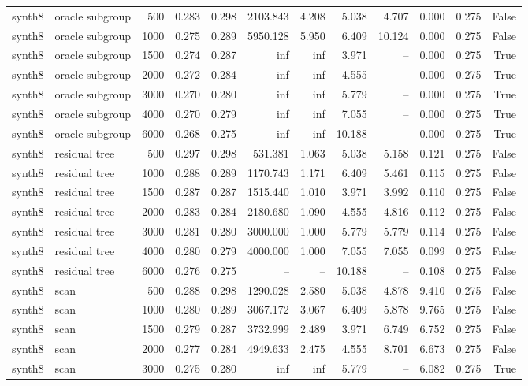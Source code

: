 \begin{tabular}{llrrrrrrrrrr}
synth8 & oracle subgroup & 500 & 0.283 & 0.298 & 2103.843 & 4.208 & 5.038 & 4.707 & 0.000 & 0.275 & False \\
synth8 & oracle subgroup & 1000 & 0.275 & 0.289 & 5950.128 & 5.950 & 6.409 & 10.124 & 0.000 & 0.275 & False \\
synth8 & oracle subgroup & 1500 & 0.274 & 0.287 & inf & inf & 3.971 & -- & 0.000 & 0.275 & True \\
synth8 & oracle subgroup & 2000 & 0.272 & 0.284 & inf & inf & 4.555 & -- & 0.000 & 0.275 & True \\
synth8 & oracle subgroup & 3000 & 0.270 & 0.280 & inf & inf & 5.779 & -- & 0.000 & 0.275 & True \\
synth8 & oracle subgroup & 4000 & 0.270 & 0.279 & inf & inf & 7.055 & -- & 0.000 & 0.275 & True \\
synth8 & oracle subgroup & 6000 & 0.268 & 0.275 & inf & inf & 10.188 & -- & 0.000 & 0.275 & True \\
synth8 & residual tree & 500 & 0.297 & 0.298 & 531.381 & 1.063 & 5.038 & 5.158 & 0.121 & 0.275 & False \\
synth8 & residual tree & 1000 & 0.288 & 0.289 & 1170.743 & 1.171 & 6.409 & 5.461 & 0.115 & 0.275 & False \\
synth8 & residual tree & 1500 & 0.287 & 0.287 & 1515.440 & 1.010 & 3.971 & 3.992 & 0.110 & 0.275 & False \\
synth8 & residual tree & 2000 & 0.283 & 0.284 & 2180.680 & 1.090 & 4.555 & 4.816 & 0.112 & 0.275 & False \\
synth8 & residual tree & 3000 & 0.281 & 0.280 & 3000.000 & 1.000 & 5.779 & 5.779 & 0.114 & 0.275 & False \\
synth8 & residual tree & 4000 & 0.280 & 0.279 & 4000.000 & 1.000 & 7.055 & 7.055 & 0.099 & 0.275 & False \\
synth8 & residual tree & 6000 & 0.276 & 0.275 & -- & -- & 10.188 & -- & 0.108 & 0.275 & False \\
synth8 & scan & 500 & 0.288 & 0.298 & 1290.028 & 2.580 & 5.038 & 4.878 & 9.410 & 0.275 & False \\
synth8 & scan & 1000 & 0.280 & 0.289 & 3067.172 & 3.067 & 6.409 & 5.878 & 9.765 & 0.275 & False \\
synth8 & scan & 1500 & 0.279 & 0.287 & 3732.999 & 2.489 & 3.971 & 6.749 & 6.752 & 0.275 & False \\
synth8 & scan & 2000 & 0.277 & 0.284 & 4949.633 & 2.475 & 4.555 & 8.701 & 6.673 & 0.275 & False \\
synth8 & scan & 3000 & 0.275 & 0.280 & inf & inf & 5.779 & -- & 6.082 & 0.275 & True \\

\end{tabular}
